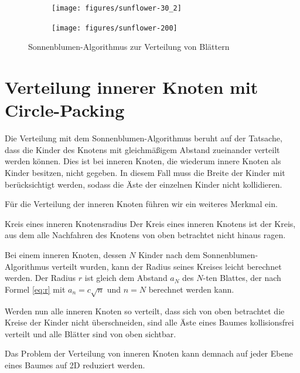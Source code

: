 \setlength{\fwidth}{.49\textwidth}
\begin{figure}[htb]
  \centering
  \begin{subfigure}[b]{\fwidth}
   \texttt{[image: figures/sunflower-30\_2]}
    \label{fig:sunflower-30}
  \end{subfigure}
  \hfill
  \begin{subfigure}[b]{\fwidth}
  	\texttt{[image: figures/sunflower-200]}
  	 \label{fig:sunflower-200}
  \end{subfigure}
  \caption{Sonnenblumen-Algorithmus zur Verteilung von Blättern} \label{fig:sunflower-algorithm}
\end{figure}

\section{Verteilung innerer Knoten mit Circle-Packing}
\label{sec:Circle-Packing}

Die Verteilung mit dem Sonnenblumen-Algorithmus beruht auf der Tatsache, dass die Kinder des Knotens mit gleichmäßigem Abstand zueinander verteilt werden können. Dies ist bei inneren Knoten, die wiederum innere Knoten als Kinder besitzen, nicht gegeben. In diesem Fall muss die Breite der Kinder mit berücksichtigt werden, sodass die Äste der einzelnen Kinder nicht kollidieren.

Für die Verteilung der inneren Knoten führen wir ein weiteres Merkmal ein.

\begin{defbox}{Kreis eines inneren Knotens}{radius}
   Der Kreis eines inneren Knotens ist der Kreis, aus dem alle Nachfahren des Knotens von oben betrachtet nicht hinaus ragen.
\end{defbox}

Bei einem inneren Knoten, dessen $N$ Kinder nach dem Sonnenblumen-Algorithmus verteilt wurden, kann der Radius seines Kreises leicht berechnet werden. Der Radius $r$ ist gleich dem Abstand $a_N$ des $N$-ten Blattes, der nach Formel \ref{eq:r} mit $a_n = c \sqrt{n}$ und $n = N$ berechnet werden kann.

Werden nun alle inneren Knoten so verteilt, dass sich von oben betrachtet die Kreise der Kinder nicht überschneiden, sind alle Äste eines Baumes kollisionsfrei verteilt und alle Blätter sind von oben sichtbar.

Das Problem der Verteilung von inneren Knoten kann demnach auf jeder Ebene eines Baumes auf 2D reduziert werden.\\

